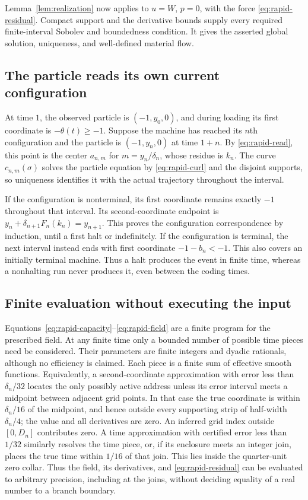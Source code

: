 Lemma~\ref{lem:realization} now applies to $u=W$, $p=0$, with the force
\eqref{eq:rapid-residual}.  Compact support and the derivative bounds
supply every required finite-interval Sobolev and boundedness condition.
It gives the asserted global solution, uniqueness, and well-defined
material flow.

\subsection{The particle reads its own current configuration}
At time $1$, the observed particle is $(-1,y_0,0)$, and during loading
its first coordinate is $-\theta(t)\geq-1$.  Suppose the machine has
reached its $n$th configuration and the particle is $(-1,y_n,0)$ at
time $1+n$.  By \eqref{eq:rapid-read}, this point is the center
$a_{n,m}$ for $m=y_n/\delta_n$, whose residue is $k_n$.  The curve
$c_{n,m}(\sigma)$ solves the particle equation by
\eqref{eq:rapid-curl} and the disjoint supports, so uniqueness identifies
it with the actual trajectory throughout the interval.

If the configuration is nonterminal, its first coordinate remains
exactly $-1$ throughout that interval.  Its second-coordinate endpoint
is $y_n+\delta_{n+1}F_n(k_n)=y_{n+1}$.  This proves the configuration
correspondence by induction, until a first halt or indefinitely.
If the configuration is terminal, the next interval instead ends with
first coordinate $-1-b_n<-1$.  This also covers an initially terminal
machine.  Thus a halt produces the event in finite time, whereas a
nonhalting run never produces it, even between the coding times.

\subsection{Finite evaluation without executing the input}
Equations~\eqref{eq:rapid-capacity}--\eqref{eq:rapid-field} are a finite
program for the prescribed field.  At any finite time only a bounded
number of possible time pieces need be considered.  Their parameters
are finite integers and dyadic rationals, although no efficiency is
claimed.  Each piece is a finite sum of effective smooth functions.
Equivalently, a second-coordinate approximation with error less than
$\delta_n/32$ locates the only possibly active address unless its error
interval meets a midpoint between adjacent grid points.  In that case
the true coordinate is within $\delta_n/16$ of the midpoint, and hence
outside every supporting strip of half-width $\delta_n/4$; the value
and all derivatives are zero. An inferred grid index outside
$[0,D_n]$ contributes zero. A time approximation with certified error
less than $1/32$ similarly resolves the time piece, or, if its enclosure
meets an integer join, places the true time within $1/16$ of that join.
This lies inside the quarter-unit zero collar. Thus the field, its derivatives, and
\eqref{eq:rapid-residual} can be evaluated to arbitrary precision,
including at the joins, without deciding equality of a real number to
a branch boundary.

